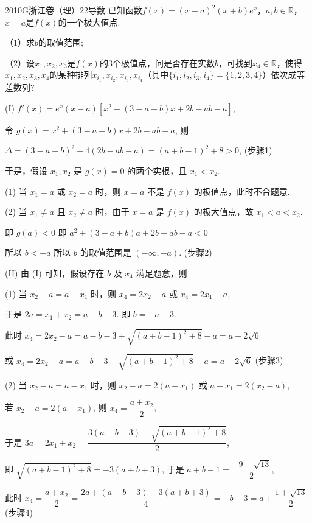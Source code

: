 
\begin{problem}{2010}{G}{浙江卷（理）}{22}{导数}
已知函数$f(x)=(x-a)^2(x+b)e^x$，$a,b\in\mathbb{R}$，$x=a$是$f(x)$的一个极大值点.

（1）求$b$的取值范围;

（2）设$x_1,x_2,x_3$是$f(x)$的3个极值点，问是否存在实数$b$，可找到$x_4\in\mathbb{R}$，使得$x_1,x_2,x_3,x_4$的某种排列$x_{i_1},x_{i_2},x_{i_3},x_{i_4}$（其中$\{i_1,i_2,i_3,i_4\}=\{1,2,3,4\}$）依次成等差数列?
\end{problem}

\begin{solutions}
(I) $f'(x) = e^x (x-a) \left[x^2+(3-a+b)x+2b-ab-a\right]$,

令 $g(x) = x^2+(3-a+b)x+2b-ab-a$, 则

$\Delta = (3-a+b)^2-4(2b-ab-a) = (a+b-1)^2+8 > 0$, (步骤1)

于是，假设 $x_1, x_2$ 是 $g(x)=0$ 的两个实根，且 $x_1 < x_2$.

(1) 当 $x_1=a$ 或 $x_2=a$ 时，则 $x=a$ 不是 $f(x)$ 的极值点，此时不合题意.

(2) 当 $x_1 \ne a$ 且 $x_2 \ne a$ 时，由于 $x=a$ 是 $f(x)$ 的极大值点，故 $x_1 < a < x_2$.

即 $g(a) < 0$ 即 $a^2+(3-a+b)a+2b-ab-a < 0$

所以 $b < -a$ 所以 $b$ 的取值范围是 $(-\infty, -a)$. (步骤2)

(II) 由 (I) 可知，假设存在 $b$ 及 $x_4$ 满足题意，则

(1) 当 $x_2-a = a-x_1$ 时，则 $x_4 = 2x_2-a$ 或 $x_4 = 2x_1-a$,

于是 $2a = x_1+x_2 = a-b-3$. 即 $b = -a-3$.

此时 $x_4 = 2x_2-a = a-b-3+\sqrt{(a+b-1)^2+8}-a = a+2\sqrt{6}$

或 $x_4 = 2x_2-a = a-b-3-\sqrt{(a+b-1)^2+8}-a = a-2\sqrt{6}$ (步骤3)

(2) 当 $x_2-a = a-x_1$ 时，则 $x_2-a = 2(a-x_1)$ 或 $a-x_1 = 2(x_2-a)$,

 若 $x_2-a = 2(a-x_1)$, 则 $x_4 = \dfrac{a+x_2}{2}$,

于是 $3a = 2x_1+x_2 = \dfrac{3(a-b-3)-\sqrt{(a+b-1)^2+8}}{2}$,

即 $\sqrt{(a+b-1)^2+8} = -3(a+b+3)$, 于是 $a+b-1 = \dfrac{-9-\sqrt{13}}{2}$,

此时 $x_4 = \dfrac{a+x_2}{2} = \dfrac{2a+(a-b-3)-3(a+b+3)}{4} = -b-3 = a+\dfrac{1+\sqrt{13}}{2}$ (步骤4)


\end{solutions}
